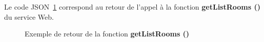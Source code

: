 \begin{appendices}
\begin{figure}[!ht]
\end{figure}

Le code JSON~\ref{annexe:getlistrooms} correspond au retour de l'appel \`a la fonction \textbf{getListRooms ()} du service Web.

\begin{figure}[!ht]
	\centering
	
	\caption{Exemple de retour de  la fonction \textbf{getListRooms ()}}
	\label{annexe:getlistrooms}

\end{figure}

\end{appendices}

\clearpage
